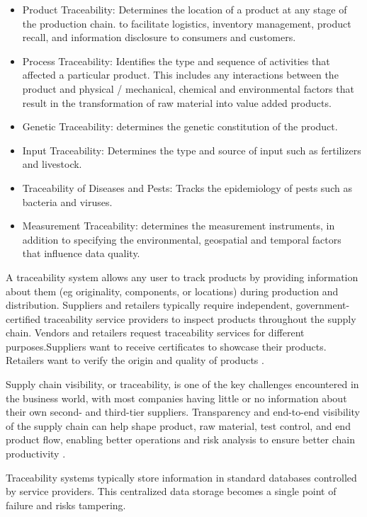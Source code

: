 \begin{itemize}
\item Product Traceability: Determines the location of a product at any stage of the production chain. to facilitate logistics, inventory management, product recall, and information disclosure to consumers and customers.
\item Process Traceability: Identifies the type and sequence of activities that affected a particular product. This includes any interactions between the product and physical / mechanical, chemical and environmental factors that result in the transformation of raw material into value added products.
\item Genetic Traceability: determines the genetic constitution of the product.
\item Input Traceability: Determines the type and source of input such as fertilizers and livestock.
\item Traceability of Diseases and Pests: Tracks the epidemiology of pests such as bacteria and viruses.
\item Measurement Traceability: determines the measurement instruments, in addition to specifying the environmental, geospatial and temporal factors that influence data quality.
\end{itemize}

A traceability system allows any user to track products by providing information about them (eg originality, components, or locations) during production and distribution. Suppliers and retailers typically require independent, government-certified traceability service providers to inspect products throughout the supply chain. Vendors and retailers request traceability services for different purposes.Suppliers want to receive certificates to showcase their products. Retailers want to verify the origin and quality of products \cite{lu2017adaptable}.

Supply chain visibility, or traceability, is one of the key challenges encountered in the business world, with most companies having little or no information about their own second- and third-tier suppliers. Transparency and end-to-end visibility of the supply chain can help shape product, raw material, test control, and end product flow, enabling better operations and risk analysis to ensure better chain productivity \cite{abeyratne2016blockchain}.

Traceability systems typically store information in standard databases controlled by service providers. This centralized data storage becomes a single point of failure and risks tampering.


